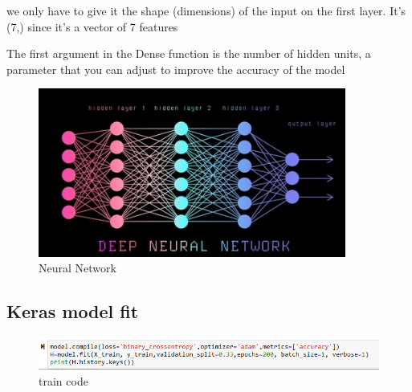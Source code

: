     we only have to give it the shape (dimensions) of the input on the first layer. 
    It’s (7,) since it’s a vector of 7 features

    The first argument in the Dense function is the number of hidden units, 
    a parameter that you can adjust to improve the accuracy of the model

    \begin{figure}[htp]
        \centering
        \includegraphics[width=0.9\textwidth]{images/Layers.jpg }
        \caption{Neural Network }
        \label{fig:example4}
    \end{figure}
\newpage
\subsection{Keras model fit}
\label{sec:Keras model fit}
    \begin{figure}[htp]
        \centering
        \includegraphics[width=1.3\textwidth]{images/compile.png }
        \caption{train code }
        \label{fig:example5}
    \end{figure}


